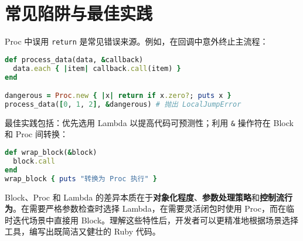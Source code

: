 \chapter{常见陷阱与最佳实践}
Proc 中误用 \verb!return! 是常见错误来源。例如，在回调中意外终止主流程：\par
\begin{lstlisting}[language=ruby]
def process_data(data, &callback)
  data.each { |item| callback.call(item) }
end

dangerous = Proc.new { |x| return if x.zero?; puts x }
process_data([0, 1, 2], &dangerous) # 抛出 LocalJumpError
\end{lstlisting}
最佳实践包括：优先选用 Lambda 以提高代码可预测性；利用 \verb!&! 操作符在 Block 和 Proc 间转换：\par
\begin{lstlisting}[language=ruby]
def wrap_block(&block)
  block.call
end
wrap_block { puts "转换为 Proc 执行" }
\end{lstlisting}
Block、Proc 和 Lambda 的差异本质在于\textbf{对象化程度}、\textbf{参数处理策略}和\textbf{控制流行为}。在需要严格参数检查时选择 Lambda，在需要灵活闭包时使用 Proc，而在临时迭代场景中直接用 Block。理解这些特性后，开发者可以更精准地根据场景选择工具，编写出既简洁又健壮的 Ruby 代码。\par
